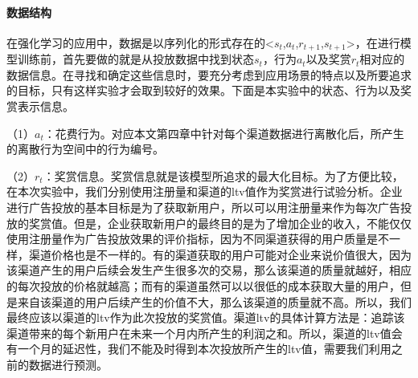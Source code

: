 \paragraph{数据结构}
在强化学习的应用中，数据是以序列化的形式存在的<$s_{t}$,$a_{t}$,$r_{t+1}$,$s_{t+1}$>，在进行模型训练前，首先要做的就是从投放数据中找到状态$s_{t}$，行为$a_{t}$以及奖赏$r_{t}$相对应的数据信息。在寻找和确定这些信息时，要充分考虑到应用场景的特点以及所要追求的目标，只有这样实验才会取到较好的效果。下面是本实验中的状态、行为以及奖赏表示信息。

（1）$a_{t}$：花费行为。对应本文第四章中针对每个渠道数据进行离散化后，所产生的离散行为空间中的行为编号。

（2）$r_{t}$：奖赏信息。奖赏信息就是该模型所追求的最大化目标。为了方便比较，在本次实验中，我们分别使用注册量和渠道的ltv值作为奖赏进行试验分析。企业进行广告投放的基本目标是为了获取新用户，所以可以用注册量来作为每次广告投放的奖赏值。但是，企业获取新用户的最终目的是为了增加企业的收入，不能仅仅使用注册量作为广告投放效果的评价指标，因为不同渠道获得的用户质量是不一样，渠道价格也是不一样的。有的渠道获取的用户可能对企业来说价值很大，因为该渠道产生的用户后续会发生产生很多次的交易，那么该渠道的质量就越好，相应的每次投放的价格就越高；而有的渠道虽然可以以很低的成本获取大量的用户，但是来自该渠道的用户后续产生的价值不大，那么该渠道的质量就不高。所以，我们最终应该以渠道的ltv作为此次投放的奖赏值。渠道ltv的具体计算方法是：追踪该渠道带来的每个新用户在未来一个月内所产生的利润之和。所以，渠道的ltv值会有一个月的延迟性，我们不能及时得到本次投放所产生的ltv值，需要我们利用之前的数据进行预测。

